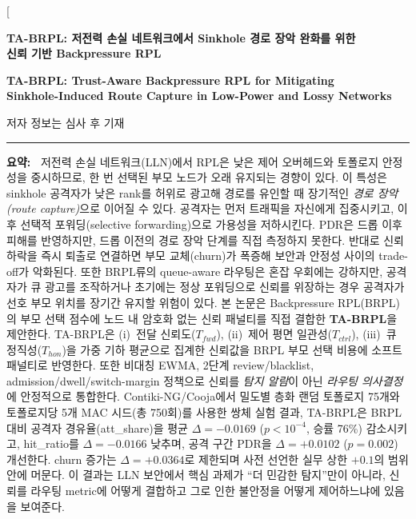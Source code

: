 \documentclass[10pt,a4paper,twocolumn]{article}
\newcommand{\koabstract}[1]{%
  \small\textbf{요약:~}#1\par}
\begin{document}
\twocolumn[{%
\begin{center}
{\fontsize{14}{17}\bfseries
TA-BRPL: 저전력 손실 네트워크에서 Sinkhole 경로 장악 완화를 위한\\
신뢰 기반 Backpressure RPL\par}
\vspace{4pt}
{\fontsize{11}{14}\bfseries
TA-BRPL: Trust-Aware Backpressure RPL for Mitigating\\
Sinkhole-Induced Route Capture in Low-Power and Lossy Networks\par}
\vspace{6pt}
{\small 저자 정보는 심사 후 기재\par}
\vspace{8pt}
\hrule\vspace{6pt}

\begin{minipage}{0.96\textwidth}
\koabstract{%
저전력 손실 네트워크(LLN)에서 RPL은 낮은 제어 오버헤드와 토폴로지 안정성을 중시하므로,
한 번 선택된 부모 노드가 오래 유지되는 경향이 있다.
이 특성은 sinkhole 공격자가 낮은 rank를 허위로 광고해 경로를 유인할 때
장기적인 \emph{경로 장악(route capture)}으로 이어질 수 있다.
공격자는 먼저 트래픽을 자신에게 집중시키고,
이후 선택적 포워딩(selective forwarding)으로 가용성을 저하시킨다.
PDR은 드롭 이후 피해를 반영하지만, 드롭 이전의 경로 장악 단계를 직접 측정하지 못한다.
반대로 신뢰 하락을 즉시 퇴출로 연결하면 부모 교체(churn)가 폭증해
보안과 안정성 사이의 trade-off가 악화된다.
또한 BRPL류의 queue-aware 라우팅은 혼잡 우회에는 강하지만,
공격자가 큐 광고를 조작하거나 초기에는 정상 포워딩으로 신뢰를 위장하는 경우
공격자가 선호 부모 위치를 장기간 유지할 위험이 있다.
본 논문은 Backpressure RPL(BRPL)의 부모 선택 점수에
노드 내 암호화 없는 신뢰 패널티를 직접 결합한 \textbf{TA-BRPL}을 제안한다.
TA-BRPL은 (i)~전달 신뢰도($T_{fwd}$), (ii)~제어 평면 일관성($T_{ctrl}$),
(iii)~큐 정직성($T_{hon}$)을 가중 기하 평균으로 집계한 신뢰값을
BRPL 부모 선택 비용에 소프트 패널티로 반영한다.
또한 비대칭 EWMA, 2단계 review/blacklist, admission/dwell/switch-margin 정책으로
신뢰를 \emph{탐지 알람}이 아닌 \emph{라우팅 의사결정}에 안정적으로 통합한다.
Contiki-NG/Cooja에서 밀도별 층화 랜덤 토폴로지 75개와
토폴로지당 5개 MAC 시드(총 750회)를 사용한 쌍체 실험 결과,
TA-BRPL은 BRPL 대비 공격자 경유율(att\_share)을
평균 $\Delta = -0.0169$ ($p < 10^{-4}$, 승률 76\%) 감소시키고,
hit\_ratio를 $\Delta = -0.0166$ 낮추며,
공격 구간 PDR을 $\Delta = +0.0102$ ($p = 0.002$) 개선한다.
churn 증가는 $\Delta = +0.0364$로 제한되며
사전 선언한 실무 상한 $+0.1$의 범위 안에 머문다.
이 결과는 LLN 보안에서 핵심 과제가 ``더 민감한 탐지''만이 아니라,
신뢰를 라우팅 metric에 어떻게 결합하고 그로 인한 불안정을 어떻게 제어하느냐에 있음을 보여준다.}
\vspace{4pt}


\end{minipage}
\end{center}}
\end{document}
